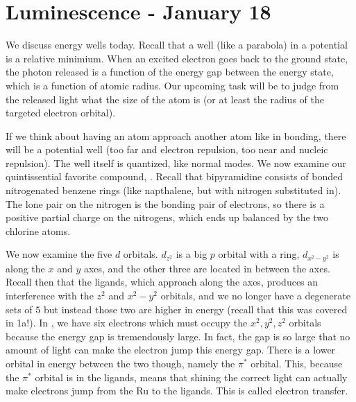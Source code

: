 \documentclass{report}
\begin{document}
\section{Luminescence - January 18}

We discuss energy wells today. Recall that a well (like a parabola) in a potential is a relative minimium. When an excited electron goes back to the ground state, the photon released is a function of the energy gap between the energy state, which is a function of atomic radius. Our upcoming task will be to judge from the released light what the size of the atom is (or at least the radius of the targeted electron orbital).

If we think about having an atom approach another atom like in bonding, there will be a potential well (too far and electron repulsion, too near and nucleic repulsion). The well itself is quantized, like normal modes. We now examine our quintissential favorite compound, . Recall that bipyramidine consists of bonded nitrogenated benzene rings (like napthalene, but with nitrogen substituted in). The lone pair on the nitrogen is the bonding pair of electrons, so there is a positive partial charge on the nitrogens, which ends up balanced by the two chlorine atoms.

We now examine the five $d$ orbitals. $d_{z^2}$ is a big $p$ orbital with a ring, $d_{x^2-y^2}$ is along the $x$ and $y$ axes, and the other three are located in between the axes. Recall then that the ligands, which approach along the axes, produces an interference with the $z^2$ and $x^2-y^2$ orbitals, and we no longer have a degenerate sets of $5$ but instead those two are higher in energy (recall that this was covered in 1a!). In , we have six electrons which must occupy the $x^2, y^2, z^2$ orbitals because the energy gap is tremendously large. In fact, the gap is so large that no amount of light can make the electron jump this energy gap. There is a lower orbital in energy between the two though, namely the $\pi^*$ orbital. This, because the $\pi^*$ orbital is in the ligands, means that shining the correct light can actually make electrons jump from the Ru to the ligands. This is called electron transfer. 
\end{document}
